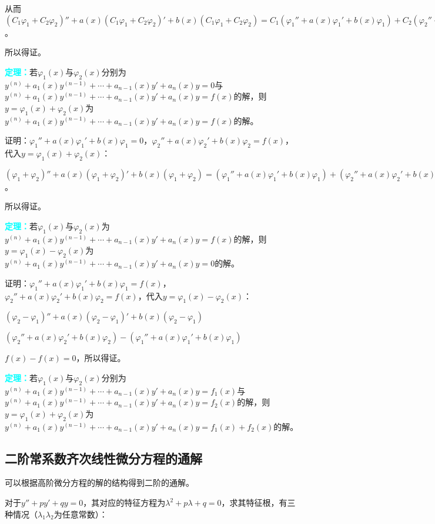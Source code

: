 \documentclass[UTF8, 12pt]{ctexart}
\begin{document}
从而$(C_1\varphi_1+C_2\varphi_2)''+a(x)(C_1\varphi_1+C_2\varphi_2)'+b(x)(C_1\varphi_1+C_2\varphi_2)=C_1(\varphi_1''+a(x)\varphi_1'+b(x)\varphi_1)+C_2(\varphi_2''+a(x)\varphi_2'+b(x)\varphi_2)=0$。

所以得证。

\textcolor{aqua}{\textbf{定理：}}若$\varphi_1(x)$与$\varphi_2(x)$分别为$y^{(n)}+a_1(x)y^{(n-1)}+\cdots+a_{n-1}(x)y'+a_n(x)y=0$与$y^{(n)}+a_1(x)y^{(n-1)}+\cdots+a_{n-1}(x)y'+a_n(x)y=f(x)$的解，则$y=\varphi_1(x)+\varphi_2(x)$为$y^{(n)}+a_1(x)y^{(n-1)}+\cdots+a_{n-1}(x)y'+a_n(x)y=f(x)$的解。

证明：$\varphi_1''+a(x)\varphi_1'+b(x)\varphi_1=0$，$\varphi_2''+a(x)\varphi_2'+b(x)\varphi_2=f(x)$，代入$y=\varphi_1(x)+\varphi_2(x)$：

$(\varphi_1+\varphi_2)''+a(x)(\varphi_1+\varphi_2)'+b(x)(\varphi_1+\varphi_2)=(\varphi_1''+a(x)\varphi_1'+b(x)\varphi_1)+(\varphi_2''+a(x)\varphi_2'+b(x)\varphi_2)=f(x)$。

所以得证。

\textcolor{aqua}{\textbf{定理：}}若$\varphi_1(x)$与$\varphi_2(x)$为$y^{(n)}+a_1(x)y^{(n-1)}+\cdots+a_{n-1}(x)y'+a_n(x)y=f(x)$的解，则$y=\varphi_1(x)-\varphi_2(x)$为$y^{(n)}+a_1(x)y^{(n-1)}+\cdots+a_{n-1}(x)y'+a_n(x)y=0$的解。

证明：$\varphi_1''+a(x)\varphi_1'+b(x)\varphi_1=f(x)$，$\varphi_2''+a(x)\varphi_2'+b(x)\varphi_2=f(x)$，代入$y=\varphi_1(x)-\varphi_2(x)$：

$(\varphi_2-\varphi_1)''+a(x)(\varphi_2-\varphi_1)'+b(x)(\varphi_2-\varphi_1)$

$(\varphi_2''+a(x)\varphi_2'+b(x)\varphi_2)-(\varphi_1''+a(x)\varphi_1'+b(x)\varphi_1)$

$f(x)-f(x)=0$，所以得证。

\textcolor{aqua}{\textbf{定理：}}若$\varphi_1(x)$与$\varphi_2(x)$分别为$y^{(n)}+a_1(x)y^{(n-1)}+\cdots+a_{n-1}(x)y'+a_n(x)y=f_1(x)$与$y^{(n)}+a_1(x)y^{(n-1)}+\cdots+a_{n-1}(x)y'+a_n(x)y=f_2(x)$的解，则$y=\varphi_1(x)+\varphi_2(x)$为$y^{(n)}+a_1(x)y^{(n-1)}+\cdots+a_{n-1}(x)y'+a_n(x)y=f_1(x)+f_2(x)$的解。

\subsection{二阶常系数齐次线性微分方程的通解}

可以根据高阶微分方程的解的结构得到二阶的通解。

对于$y''+py'+qy=0$，其对应的特征方程为$\lambda^2+p\lambda+q=0$，求其特征根，有三种情况（$\lambda_1\lambda_2$为任意常数）：
\end{document}

